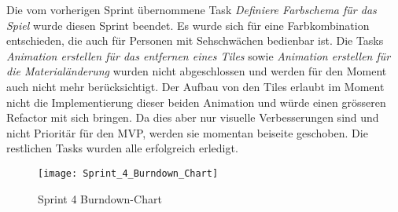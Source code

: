 \documentclass[../main.tex]{subfiles}
\begin{document}
	\par Die vom vorherigen Sprint übernommene Task \emph{Definiere Farbschema für das Spiel} wurde diesen Sprint beendet. Es wurde sich für eine Farbkombination entschieden, die auch für Personen mit Sehschwächen bedienbar ist. Die Tasks \emph{Animation erstellen für das entfernen eines Tiles} sowie \emph{Animation erstellen für die Materialänderung} wurden nicht abgeschlossen und werden für den Moment auch nicht mehr berücksichtigt. Der Aufbau von den Tiles erlaubt im Moment nicht die Implementierung dieser beiden Animation und würde einen grösseren Refactor mit sich bringen. Da dies aber nur visuelle Verbesserungen sind und nicht Prioritär für den MVP, werden sie momentan beiseite geschoben. Die restlichen Tasks wurden alle erfolgreich erledigt.
	\begin{figure}[H]
		\centering
		\texttt{[image: Sprint\_4\_Burndown\_Chart]}
		\caption{Sprint 4 Burndown-Chart}
	\end{figure}
\end{document}
